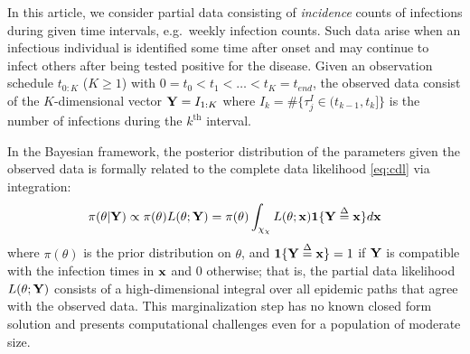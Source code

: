 \documentclass[11pt]{article}
\begin{document}
	In this article, we consider partial data consisting of \textit{incidence} counts of infections during given time intervals, e.g.\ weekly infection counts. Such data arise when an infectious individual is identified some time after onset and may continue to infect others after being tested positive for the disease. %
	Given an observation schedule $t_{0:K}$ ($K \ge 1$) with $0 = t_0 < t_1 < \dots < t_K = t_{end}$, the observed data consist of the $K$-dimensional vector $\mathbf{Y} = I_{1:K}$ where $I_k = \#\{\tau^I_j \in (t_{k-1}, t_k]\}$ is the number of infections during the $k^{\text{th}}$ interval.
	
	In the Bayesian framework, the posterior distribution of the parameters given the observed data is formally related to the complete data likelihood \eqref{eq:cdl} via integration:
	\begin{equation}
		\label{eq:pdl}
		\pi(\theta|\mathbf{Y}) 
		\propto \pi(\theta) L(\theta; \mathbf{Y}) = \pi(\theta) \int_{\chi_\chi} L(\theta; \mathbf{x}) \mathbf{1}\{\mathbf{Y} \overset{\Delta}{=} \mathbf{x}\} d\mathbf{x}
	\end{equation}
	where $\pi(\theta)$ is the prior distribution on $\theta$, and
	$\mathbf{1}\{\mathbf{Y} \overset{\Delta}{=} \mathbf{x}\} = 1$ if $\mathbf{Y}$ is compatible with the infection times in $\mathbf{x}$ and $0$ otherwise; that is, the partial data likelihood $L(\theta; \mathbf{Y})$ consists of a high-dimensional integral over all epidemic paths that agree with the observed data. This marginalization step has no known closed form solution and presents computational challenges even for a population of moderate size.
	
\end{document}
